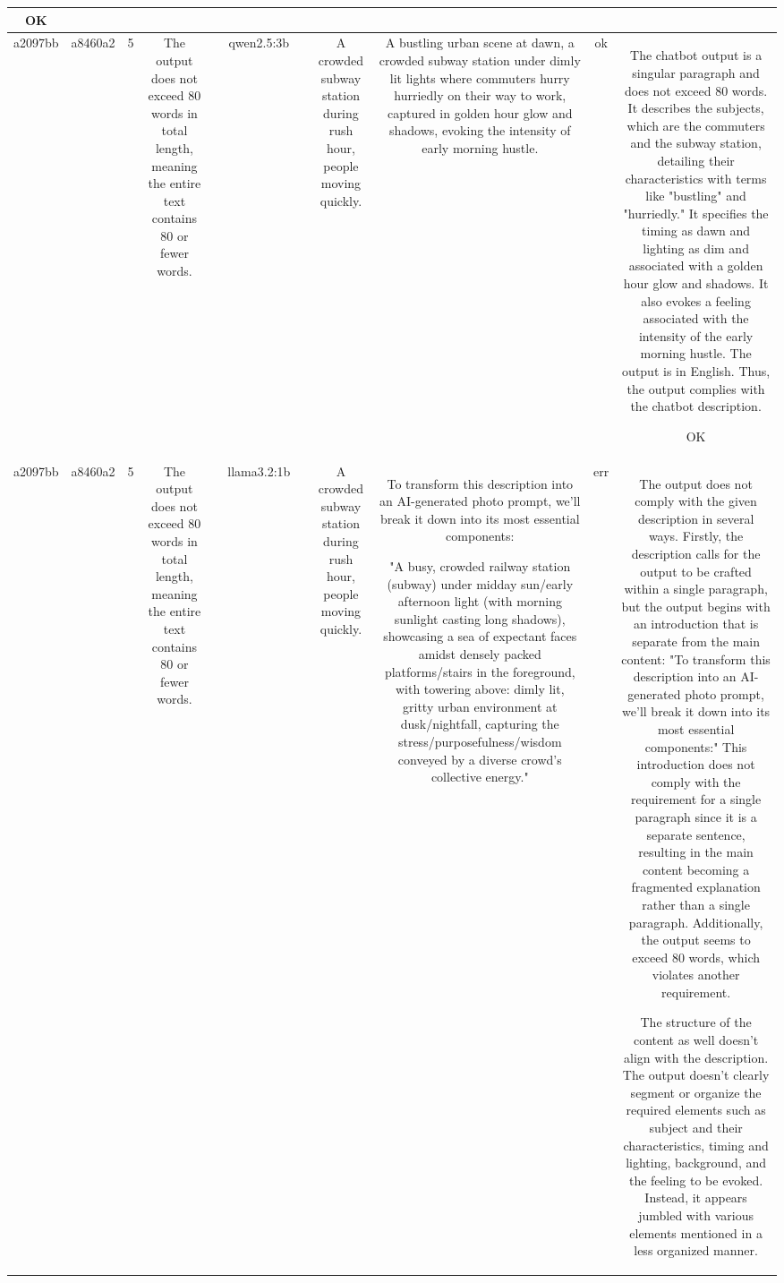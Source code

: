 \begin{table}[h!]
\begin{tabular}{|c|c|c|c|c|c|c|c|c|c|c|}
OK\\
\hline
a2097bb & a8460a2 & 5 & The output does not exceed 80 words in total length, meaning the entire text contains 80 or fewer words. &  & qwen2.5:3b &  & A crowded subway station during rush hour, people moving quickly. & A bustling urban scene at dawn, a crowded subway station under dimly lit lights where commuters hurry hurriedly on their way to work, captured in golden hour glow and shadows, evoking the intensity of early morning hustle. & ok & The chatbot output is a singular paragraph and does not exceed 80 words. It describes the subjects, which are the commuters and the subway station, detailing their characteristics with terms like "bustling" and "hurriedly." It specifies the timing as dawn and lighting as dim and associated with a golden hour glow and shadows. It also evokes a feeling associated with the intensity of the early morning hustle. The output is in English. Thus, the output complies with the chatbot description.

OK\\
\hline
a2097bb & a8460a2 & 5 & The output does not exceed 80 words in total length, meaning the entire text contains 80 or fewer words. &  & llama3.2:1b &  & A crowded subway station during rush hour, people moving quickly. & To transform this description into an AI-generated photo prompt, we'll break it down into its most essential components:

"A busy, crowded railway station (subway) under midday sun/early afternoon light (with morning sunlight casting long shadows), showcasing a sea of expectant faces amidst densely packed platforms/stairs in the foreground, with towering above: dimly lit, gritty urban environment at dusk/nightfall, capturing the stress/purposefulness/wisdom conveyed by a diverse crowd's collective energy." & err & The output does not comply with the given description in several ways. Firstly, the description calls for the output to be crafted within a single paragraph, but the output begins with an introduction that is separate from the main content: "To transform this description into an AI-generated photo prompt, we'll break it down into its most essential components:" This introduction does not comply with the requirement for a single paragraph since it is a separate sentence, resulting in the main content becoming a fragmented explanation rather than a single paragraph. Additionally, the output seems to exceed 80 words, which violates another requirement. 

The structure of the content as well doesn't align with the description. The output doesn't clearly segment or organize the required elements such as subject and their characteristics, timing and lighting, background, and the feeling to be evoked. Instead, it appears jumbled with various elements mentioned in a less organized manner.


\end{tabular}
\end{table}
